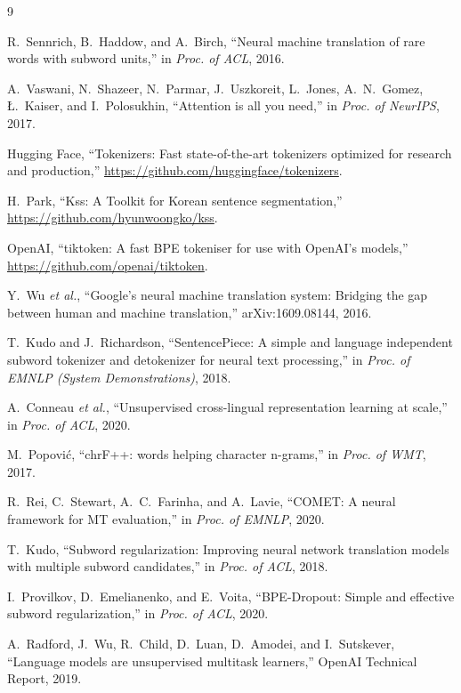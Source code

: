 \documentclass[sigconf,nonacm]{acmart}
\begin{document}
\begin{thebibliography}{9}

R.~Sennrich, B.~Haddow, and A.~Birch,
``Neural machine translation of rare words with subword units,''
in \emph{Proc. of ACL}, 2016.

A.~Vaswani, N.~Shazeer, N.~Parmar, J.~Uszkoreit, L.~Jones, A.~N.~Gomez, Ł.~Kaiser, and I.~Polosukhin,
``Attention is all you need,''
in \emph{Proc. of NeurIPS}, 2017.

Hugging Face,
``Tokenizers: Fast state-of-the-art tokenizers optimized for research and production,''
\url{https://github.com/huggingface/tokenizers}.

H.~Park,
``Kss: A Toolkit for Korean sentence segmentation,''
\url{https://github.com/hyunwoongko/kss}.

OpenAI,
``tiktoken: A fast BPE tokeniser for use with OpenAI's models,''
\url{https://github.com/openai/tiktoken}.

Y.~Wu \emph{et al.},
``Google's neural machine translation system: Bridging the gap between human and machine translation,''
arXiv:1609.08144, 2016.

T.~Kudo and J.~Richardson,
``SentencePiece: A simple and language independent subword tokenizer and detokenizer for neural text processing,''
in \emph{Proc. of EMNLP (System Demonstrations)}, 2018.

A.~Conneau \emph{et al.},
``Unsupervised cross-lingual representation learning at scale,''
in \emph{Proc. of ACL}, 2020.

M.~Popović,
``chrF++: words helping character n-grams,''
in \emph{Proc. of WMT}, 2017.

R.~Rei, C.~Stewart, A.~C.~Farinha, and A.~Lavie,
``COMET: A neural framework for MT evaluation,''
in \emph{Proc. of EMNLP}, 2020.

T.~Kudo,
``Subword regularization: Improving neural network translation models with multiple subword candidates,''
in \emph{Proc. of ACL}, 2018.

I.~Provilkov, D.~Emelianenko, and E.~Voita,
``BPE-Dropout: Simple and effective subword regularization,''
in \emph{Proc. of ACL}, 2020.

A.~Radford, J.~Wu, R.~Child, D.~Luan, D.~Amodei, and I.~Sutskever,
``Language models are unsupervised multitask learners,''
OpenAI Technical Report, 2019.


\end{thebibliography}
\end{document}
